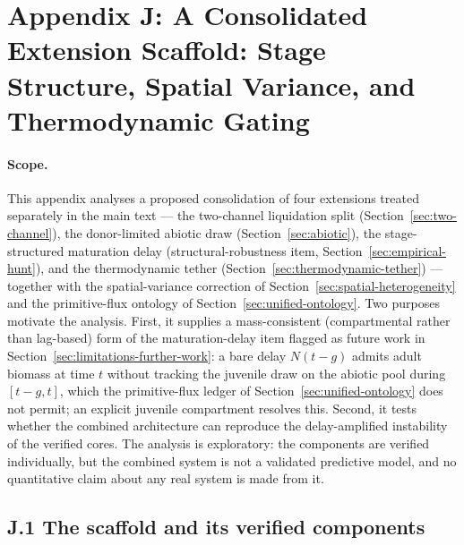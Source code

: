 \documentclass[twocolumn,10pt]{article}
\begin{document}
\section{Appendix J: A Consolidated Extension Scaffold: Stage Structure, Spatial Variance, and Thermodynamic Gating}
\label{sec:scaffold}

\paragraph{Scope.} This appendix analyses a proposed consolidation of four extensions treated separately in the main text --- the two-channel liquidation split (Section~\ref{sec:two-channel}), the donor-limited abiotic draw (Section~\ref{sec:abiotic}), the stage-structured maturation delay (structural-robustness item, Section~\ref{sec:empirical-hunt}), and the thermodynamic tether (Section~\ref{sec:thermodynamic-tether}) --- together with the spatial-variance correction of Section~\ref{sec:spatial-heterogeneity} and the primitive-flux ontology of Section~\ref{sec:unified-ontology}. Two purposes motivate the analysis. First, it supplies a mass-consistent (compartmental rather than lag-based) form of the maturation-delay item flagged as future work in Section~\ref{sec:limitations-further-work}: a bare delay $N(t-g)$ admits adult biomass at time $t$ without tracking the juvenile draw on the abiotic pool during $[t-g,t]$, which the primitive-flux ledger of Section~\ref{sec:unified-ontology} does not permit; an explicit juvenile compartment resolves this. Second, it tests whether the combined architecture can reproduce the delay-amplified instability of the verified cores. The analysis is exploratory: the components are verified individually, but the combined system is not a validated predictive model, and no quantitative claim about any real system is made from it.

\subsection{J.1 The scaffold and its verified components}
\end{document}
